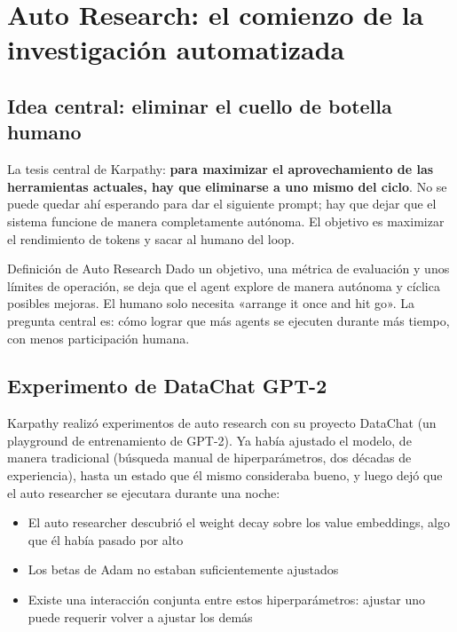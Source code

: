 \section{Auto Research: el comienzo de la investigación automatizada}

\subsection{Idea central: eliminar el cuello de botella humano}

La tesis central de Karpathy: \textbf{para maximizar el aprovechamiento de las herramientas actuales, hay que eliminarse a uno mismo del ciclo}. No se puede quedar ahí esperando para dar el siguiente prompt; hay que dejar que el sistema funcione de manera completamente autónoma. El objetivo es maximizar el rendimiento de tokens y sacar al humano del loop.

\begin{importantbox}{Definición de Auto Research}
Dado un objetivo, una métrica de evaluación y unos límites de operación, se deja que el agent explore de manera autónoma y cíclica posibles mejoras. El humano solo necesita «arrange it once and hit go». La pregunta central es: cómo lograr que más agents se ejecuten durante más tiempo, con menos participación humana.
\end{importantbox}

\subsection{Experimento de DataChat GPT-2}

Karpathy realizó experimentos de auto research con su proyecto DataChat (un playground de entrenamiento de GPT-2). Ya había ajustado el modelo, de manera tradicional (búsqueda manual de hiperparámetros, dos décadas de experiencia), hasta un estado que él mismo consideraba bueno, y luego dejó que el auto researcher se ejecutara durante una noche:

\begin{itemize}
    \item El auto researcher descubrió el weight decay sobre los value embeddings, algo que él había pasado por alto
    \item Los betas de Adam no estaban suficientemente ajustados
    \item Existe una interacción conjunta entre estos hiperparámetros: ajustar uno puede requerir volver a ajustar los demás
\end{itemize}

